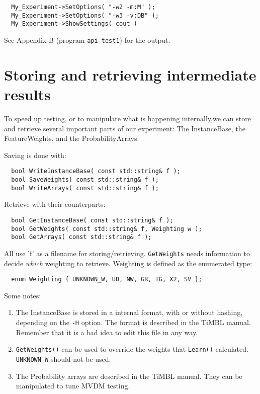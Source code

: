 \begin{footnotesize}
\begin{verbatim}
  My_Experiment->SetOptions( "-w2 -m:M" );
  My_Experiment->SetOptions( "-w3 -v:DB" );
  My_Experiment->ShowSettings( cout )
\end{verbatim}
\end{footnotesize}

See Appendix B (program {\tt api\_test1}) for the output.

\section{Storing and retrieving intermediate results}

To speed up testing, or to manipulate what is happening internally,we
can store and retrieve several important parts of our experiment: The
InstanceBase, the FeatureWeights, and the ProbabilityArrays.

Saving is done with:

\begin{footnotesize}
\begin{verbatim}
  bool WriteInstanceBase( const std::string& f );
  bool SaveWeights( const std::string& f );
  bool WriteArrays( const std::string& f );
\end{verbatim}
\end{footnotesize}

Retrieve with their counterparts:

\begin{footnotesize}
\begin{verbatim}
  bool GetInstanceBase( const std::string& f );
  bool GetWeights( const std::string& f, Weighting w );
  bool GetArrays( const std::string& f );
\end{verbatim}
\end{footnotesize}

All use 'f' as a filename for storing/retrieving. {\tt GetWeights} needs
information to decide {\em which}\/ weighting to retrieve.
Weighting is defined as the enumerated type:

\begin{footnotesize}
\begin{verbatim}
  enum Weighting { UNKNOWN_W, UD, NW, GR, IG, X2, SV };
\end{verbatim}
\end{footnotesize}

Some notes:

\begin{enumerate}
\item The InstanceBase is stored in a internal format, with or without
hashing, depending on the {\tt -H} option. The format is described in the
TiMBL manual. Remember that it is a bad idea to edit this file in any way.
\item {\tt GetWeights()} can be used to override the weights that
{\tt Learn()} calculated. {\tt UNKNOWN\_W} should not be used.
\item The Probability arrays are described in the TiMBL manual. They can be
manipulated to tune MVDM testing.
\end{enumerate}

